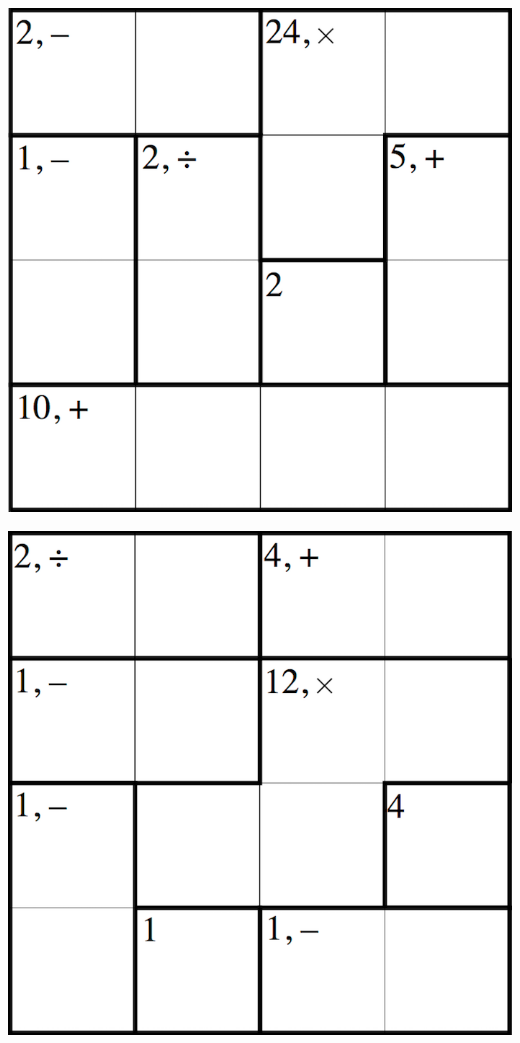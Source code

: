 
\includegraphics[scale=1]{Gambar/Lampiran/4x4_11.png}

\includegraphics[scale=1]{Gambar/Lampiran/4x4_12.png}
